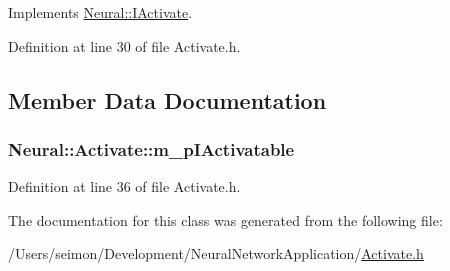 Implements \hyperlink{class_neural_1_1_i_activate_a64d6b5c9f9bae812a28e6151f9c78829}{Neural::IActivate}.



Definition at line 30 of file Activate.h.



\subsection{Member Data Documentation}
\hypertarget{class_neural_1_1_activate_a9848f6b94305235b0af46088c289c9ee}{
\subsubsection[{m\_\-pIActivatable}]{ {\bf Neural::Activate::m\_\-pIActivatable}}}
\label{class_neural_1_1_activate_a9848f6b94305235b0af46088c289c9ee}


Definition at line 36 of file Activate.h.



The documentation for this class was generated from the following file:\begin{DoxyCompactItemize}
\item 
/Users/seimon/Development/NeuralNetworkApplication/\hyperlink{_activate_8h}{Activate.h}\end{DoxyCompactItemize}
